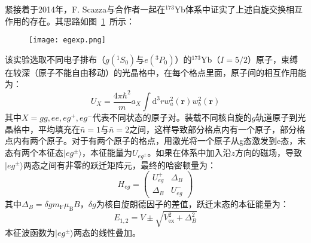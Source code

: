 紧接着于2014年，F. Scazza\cite{scazza2014observation}与合作者一起在${}^{173}$Yb体系中证实了上述自旋交换相互作用的存在。其思路如图~\ref{egexp}~所示：
\begin{figure}[!htbp]
    \centering
    \texttt{[image: egexp.png]}
    \label{egexp}
\end{figure}
该实验选取不同电子排布（$g({}^1S_0)$与$e({}^3P_0)$）的${}^{173}$Yb（$I=5/2$）原子，束缚在较深（原子不能自由移动）的光晶格中，在每个格点里面，原子间的相互作用能为：
\begin{equation}
U_{X}=\frac{4 \pi \hbar^{2}}{m} a_{X} \int \mathrm{d}^{3} r w_{a}^{2}(\mathbf{r}) w_{b}^{2}(\mathbf{r})
\end{equation}
其中$X =gg, ee, eg^+, eg^−$代表不同状态的原子对。装载不同核自旋的$g$轨道原子到光晶格中，平均填充在$\bar{n}=1$与$\bar{n}=2$之间，这样导致部分格点内有一个原子，部分格点内有两个原子。对于有两个原子的格点，用激光将一个原子从g态激发到e态，末态有两个本征态$|eg^\pm\rangle$，本征能量为$U_{eg^\pm}$。如果在体系中加入沿$z$方向的磁场，导致$|eg^\pm\rangle$两态之间有非零的跃迁矩阵元，最终的哈密顿量为：
\begin{equation}
H_{e g}=\left(\begin{array}{cc}
U_{e g}^{+} & \Delta_{B} \\
\Delta_{B} & U_{e g}^{-}
\end{array}\right)
\end{equation}
其中$\Delta_{B}=\delta g m_{\mathrm{F}} \mu_{\mathrm{B}} B$，$\delta g$为核自旋朗德因子的差值，跃迁末态的本征能量为：
\begin{equation}
E_{1,2}=V \pm \sqrt{V_{\mathrm{ex}}^{2}+\Delta_{B}^{2}}
\end{equation}
本征波函数为$|eg^\pm\rangle$两态的线性叠加。

